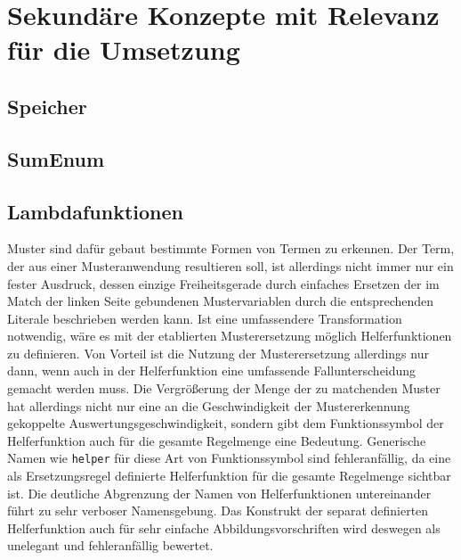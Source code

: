 

\section{Sekundäre Konzepte mit Relevanz für die Umsetzung} \label{secHilfUmsetzungInCpp}

\subsection{Speicher} \label{subsecCppSpeicher}

\subsection{SumEnum} \label{subsecCppSumEnum}

\subsection{Lambdafunktionen} \label{subsecLambdafunktionen}
Muster sind dafür gebaut bestimmte Formen von Termen zu erkennen. Der Term, der aus einer Musteranwendung resultieren soll, ist allerdings nicht immer nur ein fester Ausdruck, dessen einzige Freiheitsgerade durch einfaches Ersetzen der im Match der linken Seite gebundenen Mustervariablen durch die entsprechenden Literale beschrieben werden kann. Ist eine umfassendere Transformation notwendig, wäre es mit der etablierten Musterersetzung möglich Helferfunktionen zu definieren. Von Vorteil ist die Nutzung der Musterersetzung allerdings nur dann, wenn auch in der Helferfunktion eine umfassende Fallunterscheidung gemacht werden muss. Die Vergrößerung der Menge der zu matchenden Muster hat allerdings nicht nur eine an die Geschwindigkeit der Mustererkennung gekoppelte Auswertungsgeschwindigkeit,  sondern gibt dem Funktionssymbol der Helferfunktion auch für die gesamte Regelmenge eine Bedeutung. 
Generische Namen wie \texttt{helper} für diese Art von Funktionssymbol sind fehleranfällig, da eine als Ersetzungsregel definierte Helferfunktion für die gesamte Regelmenge sichtbar ist. Die deutliche Abgrenzung der Namen von Helferfunktionen untereinander führt zu sehr verboser Namensgebung.
Das Konstrukt der separat definierten Helferfunktion auch für sehr einfache Abbildungsvorschriften wird deswegen als unelegant und fehleranfällig bewertet. 
